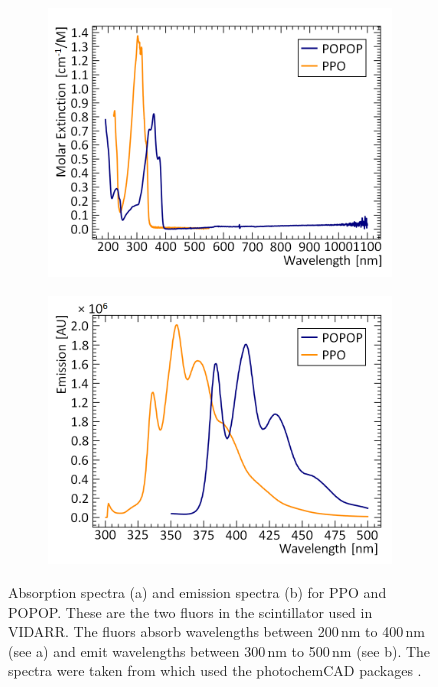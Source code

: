 \begin{figure}[!h]
\centering
\begin{subfigure}{.45\textwidth}
  \centering
  \includegraphics[width=\linewidth]{Chapter4/Figs/ppo_popop_absorption_graph_adjust.png}
  \captionsetup{width=.9\linewidth}
  \caption{}
  \label{subFig:ppoPopopAbsorb}
\end{subfigure}%
\qquad
\begin{subfigure}{.45\textwidth}
  \centering
  \includegraphics[width=\linewidth]{Chapter4/Figs/ppo_popop_emission_graph_adjust.png}
  \captionsetup{width=.9\linewidth}
  \caption{}
  \label{subFig:ppoPopopEmiss}
\end{subfigure}
\caption[Absorption and emission spectra for PPO and POPOP.]{Absorption spectra (a) and emission spectra (b) for PPO and POPOP. These are the two fluors in the scintillator used in VIDARR. The fluors absorb wavelengths between 200\,nm to 400\,nm  (see a) and emit wavelengths between 300\,nm to 500\,nm (see b). The spectra were taken from \cite{omlcPPO} \cite{omlcPOPOP} which used the photochemCAD packages \cite{du98photochemcad} \cite{dixon2005photochemcad}. }
\label{fig:ppoPopopAbsorbEmiss}
\end{figure}

